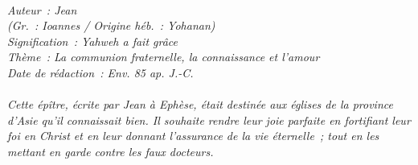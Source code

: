 \BFont
\noindent\hrulefill
{\footnotesize
\textit{
\bigskip
{\centering{}
\\Auteur~: Jean
\\(Gr.~: Ioannes / Origine héb.~: Yohanan)
\\Signification~: Yahweh a fait grâce
\\Thème~: La communion fraternelle, la connaissance et l'amour
\\Date de rédaction~: Env. 85 ap. J.-C.\\}
}
\textit{
\\Cette épître, écrite par Jean à Ephèse, était destinée aux églises de la province d'Asie qu'il connaissait bien. Il souhaite rendre leur joie parfaite en fortifiant leur foi en Christ et en leur donnant l'assurance de la vie éternelle~; tout en les mettant en garde contre les faux docteurs.\bigskip
}
}
\par\nobreak\noindent\hrulefill
